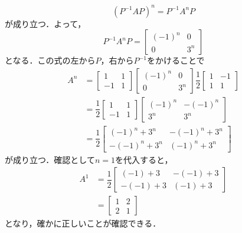 \documentclass[a4paper,12pt,autodetect-engine,dvipdfmx]{jsarticle}
\theoremstyle{definition}
\begin{document}
\begin{equation*}
    (P^{-1}AP)^n = P^{-1}A^nP
\end{equation*}
が成り立つ．よって，
\begin{equation*}
    P^{-1}A^n P = 
    \begin{bmatrix}
        (-1)^n & 0\\
        0 & 3^n
    \end{bmatrix}
\end{equation*}
となる．この式の左から$P$，右から$P^{-1}$をかけることで
\begin{align*}
    A^n &=
    \begin{bmatrix}
        1 & 1\\
        -1 & 1
    \end{bmatrix}
    \begin{bmatrix}
        (-1)^n & 0\\
        0 & 3^n
    \end{bmatrix}
    \dfrac{1}{2}
    \begin{bmatrix}
        1 & -1\\
        1 & 1
    \end{bmatrix}\\
    &=
    \dfrac{1}{2}
    \begin{bmatrix}
        1 & 1\\
        -1 & 1
    \end{bmatrix}
    \begin{bmatrix}
        (-1)^n & -(-1)^n \\
        3^n & 3^n
    \end{bmatrix}\\
    &=
    \dfrac{1}{2}
    \begin{bmatrix}
        (-1)^n + 3^n & -(-1)^n + 3^n \\
        -(-1)^n + 3^n & (-1)^n + 3^n
    \end{bmatrix}
\end{align*}
が成り立つ．確認として$n=1$を代入すると，
\begin{align*}
    A^1 &=
    \dfrac{1}{2}
    \begin{bmatrix}
        (-1) + 3 & -(-1) + 3 \\
        -(-1) + 3 & (-1) + 3
    \end{bmatrix}\\
    &=
    \begin{bmatrix}
        1 & 2\\
        2 & 1
    \end{bmatrix}
\end{align*}
となり，確かに正しいことが確認できる．
\end{document}
